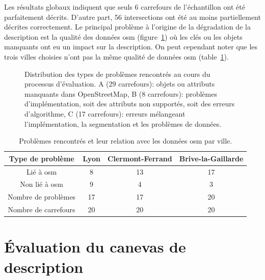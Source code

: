 \newpar{}

Les résultats globaux indiquent que seuls 6 carrefours de l'échantillon ont été parfaitement décrits. D'autre part, 56 intersections ont été au moins partiellement décrites correctement. Le principal problème à l'origine de la dégradation de la description est la qualité des données \gls{osm} (figure~\ref{fig:camissues}) où les clés ou les objets manquants ont eu un impact sur la description. On peut cependant noter que les trois villes choisies n'ont pas la même qualité de données \gls{osm} (table~\ref{tab:osmqualityissues}).

\begin{figure}[ht]
    \centering
    \caption[Types de problèmes rencontrés au cours du processus d'évaluation]{Distribution des types de problèmes rencontrés au cours du processus d'évaluation. A (29 carrefours): objets ou attributs manquants dans OpenStreetMap, B (8 carrefours): problèmes d'implémentation, soit des attributs non supportés, soit des erreurs d'algorithme, C (17 carrefours): erreurs mélangeant l'implémentation, la segmentation et les problèmes de données.}
    \label{fig:camissues}
\end{figure}

\begin{table}[ht]
    \begin{center}
        \footnotesize
        \begin{tabular}{c | c | c | c }
            Type de problème & Lyon & Clermont-Ferrand & Brive-la-Gaillarde\\
            \hline
            Lié à \gls{osm} & 8  & 13 & 17 \\
            Non lié à \gls{osm} & 9 & 4 & 3 \\
            \hline
            Nombre de problèmes & 17 & 17 & 20 \\
            Nombre de carrefours & 20 & 20 & 20
        \end{tabular}
        \caption[Relation entre les problèmes rencontrés et les données OpenStreetMap]{Problèmes rencontrés et leur relation avec les données \gls{osm} par ville.}
        \label{tab:osmqualityissues}
    \end{center}
\end{table}

\section{Évaluation du canevas de description}

